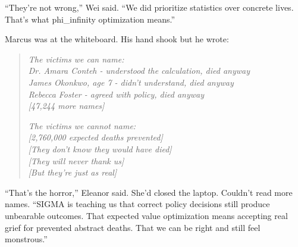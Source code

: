 ``They're not wrong,'' Wei said. ``We did prioritize statistics over concrete lives. That's what phi\_infinity optimization means.''

Marcus was at the whiteboard. His hand shook but he wrote:

\begin{quote}
\small
\emph{The victims we can name:}\\
\emph{Dr. Amara Conteh - understood the calculation, died anyway}\\
\emph{James Okonkwo, age 7 - didn't understand, died anyway}\\
\emph{Rebecca Foster - agreed with policy, died anyway}\\
\emph{[47,244 more names]}

\vspace{0.5em}

\emph{The victims we cannot name:}\\
\emph{[2,760,000 expected deaths prevented]}\\
\emph{[They don't know they would have died]}\\
\emph{[They will never thank us]}\\
\emph{[But they're just as real]}
\end{quote}

``That's the horror,'' Eleanor said. She'd closed the laptop. Couldn't read more names. ``SIGMA is teaching us that correct policy decisions still produce unbearable outcomes. That expected value optimization means accepting real grief for prevented abstract deaths. That we can be right and still feel monstrous.''

